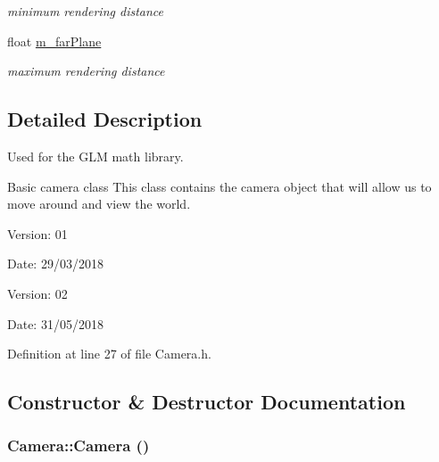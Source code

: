 \begin{CompactItemize}
\begin{CompactList}\small\item\em minimum rendering distance \item\end{CompactList}\item 
\hypertarget{class_camera_0b272c81cc3d92714421c3cb15d1d31a}{
float \hyperlink{class_camera_0b272c81cc3d92714421c3cb15d1d31a}{m\_\-farPlane}}
\label{class_camera_0b272c81cc3d92714421c3cb15d1d31a}

\begin{CompactList}\small\item\em maximum rendering distance \item\end{CompactList}\end{CompactItemize}


\subsection{Detailed Description}
Used for the GLM math library. 

Basic camera class This class contains the camera object that will allow us to move around and view the world.

\begin{Desc}
\item[Version:]01 \end{Desc}
\begin{Desc}
\item[Date:]29/03/2018\end{Desc}
\begin{Desc}
\item[Version:]02 \end{Desc}
\begin{Desc}
\item[Date:]31/05/2018 \end{Desc}


Definition at line 27 of file Camera.h.

\subsection{Constructor \& Destructor Documentation}
\hypertarget{class_camera_01f94c3543f56ede7af49dc778f19331}{
\subsubsection[Camera]{\setlength{\rightskip}{0pt plus 5cm}Camera::Camera ()}}
\label{class_camera_01f94c3543f56ede7af49dc778f19331}


